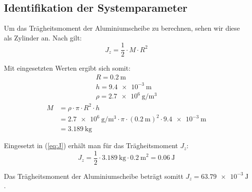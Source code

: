 \documentclass[a4paper,12pt]{scrartcl}
\begin{document}
\subsection{Identifikation der Systemparameter} %

Um das Trägheitsmoment der Aluminiumscheibe zu berechnen, sehen wir diese als Zylinder an.
Nach \cite{tbmetall}  gilt:
\begin{equation}
	\label{eq:J}
	J_z = \frac{1}{2} \cdot M \cdot R^2
\end{equation}

Mit eingesetzten Werten ergibt sich somit:
\begin{gather}
	R = \SI{0.2}{\metre} \\
	h = \SI{9.4e-3}{\metre} \\
	\rho = \SI{2.7e6}{\gram\per\cubic\metre}
\end{gather}
\begin{align}
	M &= \rho \cdot \pi \cdot R^2 \cdot h \\
	&= \SI{2.7e6}{\gram\per\cubic\metre} \cdot \pi \cdot \left( \SI{0.2}{\metre} \right)^2 \cdot \SI{9.4e-3}{\metre} \\
	&= \SI{3.189}{\kilogram}
\end{align}

Eingesetzt in (\ref{eq:J}) erhält man für das Trägheitsmoment $J_{z}$:
\begin{equation}
	J_z = \frac{1}{2} \cdot \SI{3.189}{\kilogram} \cdot {\SI{0.2}{\metre}}^2 = \SI{0.06}{\joule}
\end{equation}

Das Trägheitsmoment der Aluminiumscheibe beträgt somitt $J_{z} = \SI{63.79e-3}{\joule}$.
\end{document}
